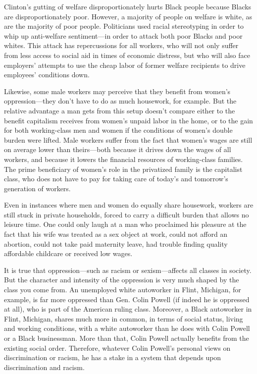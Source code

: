 Clinton's gutting of welfare disproportionately hurts Black people because Blacks are disproportionately poor. However, a majority of people on welfare is white, as are the majority of poor people. Politicians used racial stereotyping in order to whip up anti-welfare sentiment---in order to attack both poor Blacks and poor whites. This attack has repercussions for all workers, who will not only suffer from less access to social aid in times of economic distress, but who will also face employers' attempts to use the cheap labor of former welfare recipients to drive employees' conditions down.

Likewise, some male workers may perceive that they benefit from women's oppression---they don't have to do as much housework, for example. But the relative advantage a man gets from this setup doesn't compare either to the benefit capitalism receives from women's unpaid labor in the home, or to the gain for both working-class men and women if the conditions of women's double burden were lifted. Male workers suffer from the fact that women's wages are still on average lower than theirs---both because it drives down the wages of all workers, and because it lowers the financial resources of working-class families. The prime beneficiary of women's role in the privatized family is the capitalist class, who does not have to pay for taking care of today's and tomorrow's generation of workers.

Even in instances where men and women do equally share housework, workers are still stuck in private households, forced to carry a difficult burden that allows no leisure time. One could only laugh at a man who proclaimed his pleasure at the fact that his wife was treated as a sex object at work, could not afford an abortion, could not take paid maternity leave, had trouble finding quality affordable childcare or received low wages.

It is true that oppression---such as racism or sexism---affects all classes in society. But the character and intensity of the oppression is very much shaped by the class you come from. An unemployed white autoworker in Flint, Michigan, for example, is far more oppressed than Gen. Colin Powell (if indeed he is oppressed at all), who is part of the American ruling class. Moreover, a Black autoworker in Flint, Michigan, shares much more in common, in terms of social status, living and working conditions, with a white autoworker than he does with Colin Powell or a Black businessman. More than that, Colin Powell actually benefits from the existing social order. Therefore, whatever Colin Powell's personal views on discrimination or racism, he has a stake in a system that depends upon discrimination and racism.

